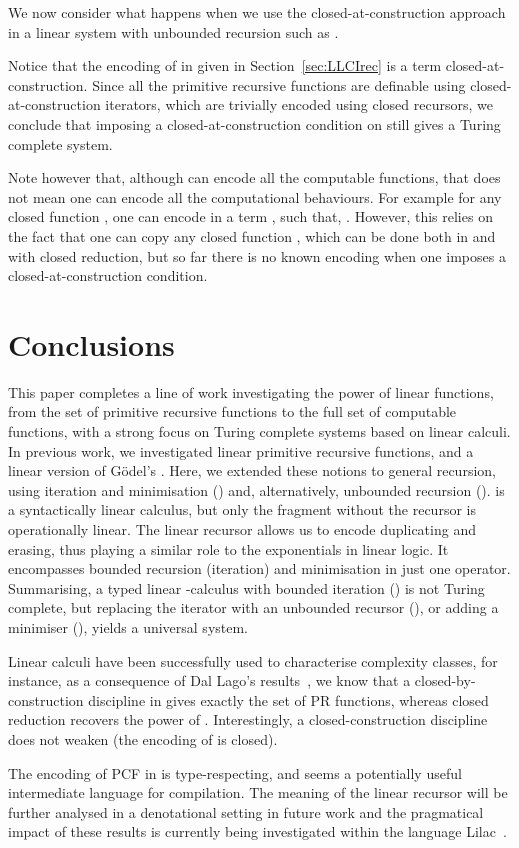 \documentclass{article}
\begin{document}
We now consider what happens when we use the closed-at-construction
approach in a linear system with unbounded recursion such as \LLCIrec.

Notice that the encoding of  in  given in Section~\ref{sec:LLCIrec}
is a term
closed-at-construction.  Since all the primitive recursive functions
are definable using closed-at-construction iterators, which are
trivially encoded using closed  recursors, we conclude that
imposing a closed-at-construction condition on \LLCIrec still gives a
Turing complete system.

Note however that, although \LLCIrec can encode all the computable
functions, that does not mean one can encode all the computational
behaviours. For example for any closed function , one can encode in
 a term , such that, . However, this relies
on the fact that one can copy any closed function , which can be
done both in \LLCI and \LLCIrec with closed reduction, but so far
there is no known encoding when one imposes a closed-at-construction
condition.


\section{Conclusions}\label{sec:conc}
This paper completes a line of work investigating
the power of linear functions, from the set of primitive recursive
functions to the full set of computable functions, with a strong focus
on Turing complete systems based on linear calculi. In
previous work, we  investigated linear primitive recursive functions, and a
linear version of G\"odel's \ST. Here, we extended these notions to general
recursion, using iteration and minimisation () and, alternatively,
unbounded recursion ().  \LLCIrec is a syntactically linear
calculus, but only the fragment without the recursor is operationally
linear.  The linear recursor allows us to encode duplicating and
erasing, thus playing a similar role to the exponentials in linear
logic. It encompasses bounded recursion (iteration) and minimisation
in just one operator.
Summarising, a typed linear -calculus
with bounded iteration (\LLCI) is not Turing complete, but replacing
the iterator with an unbounded recursor (), or adding a
minimiser (), yields a universal system.

Linear calculi have been successfully used to characterise complexity
classes, for instance, as a consequence of Dal Lago's
results~\cite{Lago05}, we know that a closed-by-construction
discipline in \LLCI gives exactly the set of PR functions, whereas
closed reduction recovers the power of \ST. Interestingly, a
closed-construction discipline does not weaken  (the encoding
of  is closed).

The encoding of PCF in  is type-respecting, and  seems a
potentially useful intermediate language for compilation. The meaning of the linear recursor will be
further analysed in a denotational setting in future work and the
pragmatical impact of these results is currently being investigated
within the language Lilac~\cite{MackieIC:lilfpl}. 









\label{sect:bib}
\end{document}
